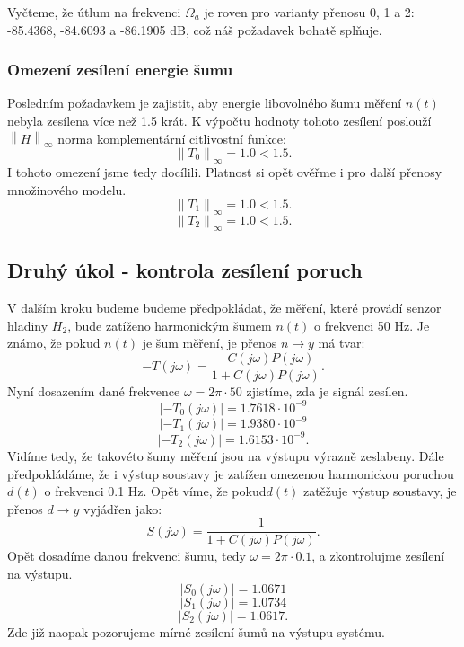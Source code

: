 \documentclass[a4paper,11pt]{article}
\begin{document}
Vyčteme, že útlum na frekvenci $ \Omega _{a} $ je roven pro varianty přenosu 0, 1 a 2: 
-85.4368, -84.6093 a -86.1905 dB, což náš požadavek bohatě splňuje.


\subsubsection{Omezení zesílení energie šumu}
Posledním požadavkem je zajistit, aby energie libovolného šumu měření $ n\left ( t \right ) $ nebyla zesílena více než 1.5 krát. K výpočtu hodnoty tohoto zesílení poslouží $ \left \| H \right \|_{\infty } $ norma komplementární citlivostní funkce:
\begin{equation}
\left \| T_{0} \right \|_{\infty } = 1.0 <1.5.
\end{equation}
I tohoto omezení jsme tedy docílili. Platnost si opět ověřme i pro další přenosy množinového modelu.
\begin{equation}
\left \| T_{1} \right \|_{\infty } = 1.0 <1.5.
\end{equation}
\begin{equation}
\left \| T_{2} \right \|_{\infty } = 1.0 <1.5.
\end{equation}

\newpage 
\subsection{Druhý úkol - kontrola zesílení poruch}\label{sec:2_2} 
V dalším kroku budeme budeme předpokládat, že měření, které provádí senzor hladiny $ H_{2} $, bude zatíženo harmonickým šumem $ n\left ( t \right ) $ o frekvenci 50 Hz. Je známo, že pokud $ n\left ( t \right ) $ je šum měření, je přenos $ n\rightarrow y $ má tvar:
\begin{equation}
-T\left ( j\omega  \right ) = \frac{-C\left ( j\omega  \right )P\left (j\omega  \right )}{1+ C\left ( j\omega  \right )P\left ( j\omega  \right )}.
\end{equation}
Nyní dosazením dané frekvence $ \omega = 2\pi \cdot 50 $ zjistíme, zda je signál zesílen.
$$ \left | -T_{0}\left ( j\omega  \right ) \right | = 1.7618\cdot 10^{-9}$$
$$ \left | -T_{1}\left ( j\omega  \right ) \right | = 1.9380\cdot 10^{-9}$$
$$ \left | -T_{2}\left ( j\omega  \right ) \right | = 1.6153\cdot 10^{-9}.$$
Vidíme tedy, že takovéto šumy měření jsou na výstupu výrazně zeslabeny.
Dále předpokládáme, že i výstup soustavy je zatížen omezenou harmonickou poruchou $ d\left ( t \right ) $ o frekvenci 0.1 Hz. Opět víme, že pokud$ d\left ( t \right ) $ zatěžuje výstup soustavy, je přenos $ d\rightarrow y $ vyjádřen jako:
\begin{equation}
S\left ( j\omega  \right ) = \frac{1}{1+ C\left ( j\omega  \right )P\left ( j\omega  \right )}.
\end{equation}
Opět dosadíme danou frekvenci šumu, tedy $ \omega = 2\pi \cdot 0.1 $, a zkontrolujme zesílení na výstupu.
$$ \left | S_{0}\left ( j\omega  \right ) \right | = 1.0671 $$
$$ \left | S_{1}\left ( j\omega  \right ) \right | = 1.0734 $$
$$ \left | S_{2}\left ( j\omega  \right ) \right | = 1.0617.$$
Zde již naopak pozorujeme mírné zesílení
šumů na výstupu systému.
\end{document}
